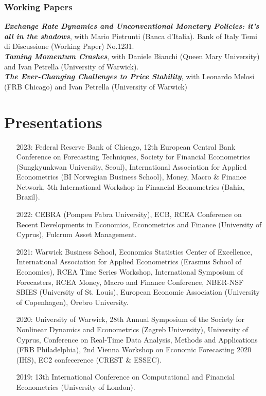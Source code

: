 \documentclass[a4paper,12pt]{article}
\begin{document}
\subsubsection*{Working Papers}
\textit{\textbf{Exchange Rate Dynamics and Unconventional Monetary Policies: it’s all in the shadows}}, with Mario Pietrunti (Banca d'Italia). Bank of Italy Temi di Discussione (Working Paper) No.1231.\\[.5em]
\textit{\textbf{Taming Momentum Crashes}}, with Daniele Bianchi (Queen Mary University) and Ivan Petrella (University of Warwick).\\[.5em]
\textit{\textbf{The Ever-Changing Challenges to Price Stability}}, with Leonardo Melosi (FRB Chicago) and Ivan Petrella (University of Warwick)

\section{Presentations}
\begin{itemize}
    \item[2023:] Federal Reserve Bank of Chicago, 12th European Central Bank Conference on Forecasting Techniques, Society for Financial Econometrics (Sungkyunkwan University, Seoul), International Association for Applied Econometrics (BI Norwegian Business School), Money, Macro \& Finance Network, 5th International Workshop in Financial Econometrics (Bahia, Brazil). 
    \item[2022:] CEBRA (Pompeu Fabra University), ECB, RCEA Conference on Recent Developments in Economics, Econometrics and Finance (University of Cyprus), Fulcrum Asset Management.
    \item[2021:] Warwick Business School, Economics Statistics Center of Excellence, International Association for Applied Econometrics (Erasmus School of Economics),  RCEA Time Series Workshop, International Symposium of Forecasters,  RCEA Money, Macro and Finance Conference, NBER-NSF SBIES (University of St. Louis), European Economic Association (University of Copenhagen), \"Orebro University.
    \item[2020:] University of Warwick, 28th Annual Symposium of the Society for Nonlinear Dynamics and Econometrics (Zagreb University), University of Cyprus, Conference on Real-Time Data Analysis, Methods and Applications (FRB Philadelphia), 2nd Vienna Workshop on Economic Forecasting 2020 (IHS), EC\^2 confecerence (CREST \& ESSEC).
    \item[2019:] 13th International Conference on Computational and Financial Econometrics (University of London).
\end{itemize}
\end{document}
